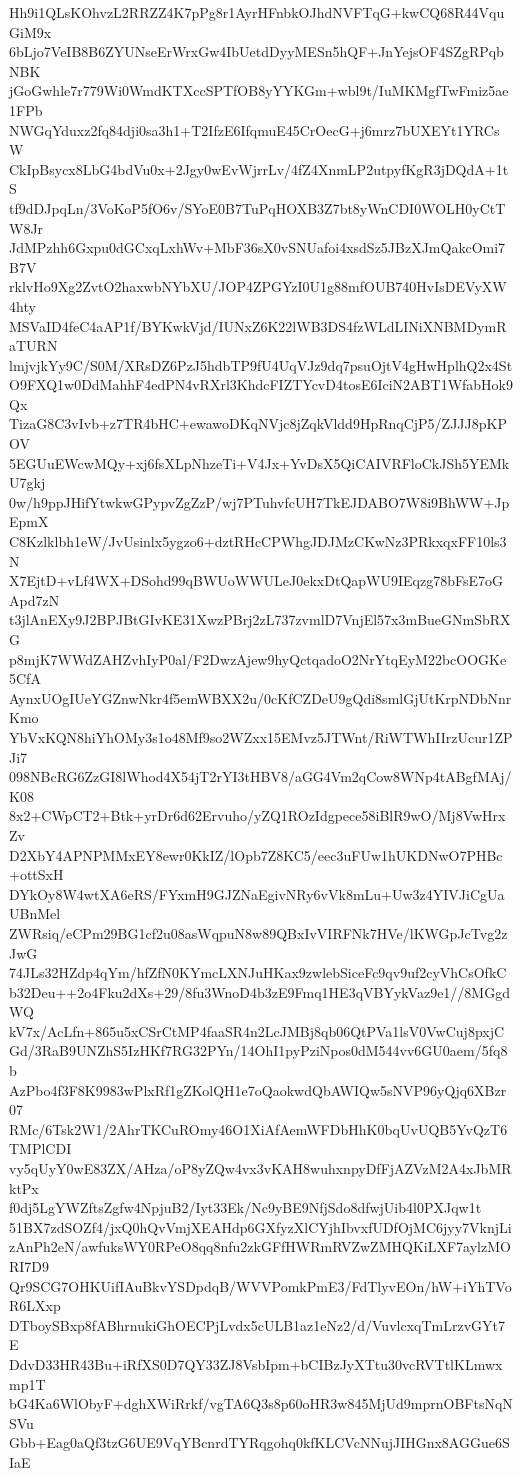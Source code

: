 Hh9i1QLsKOhvzL2RRZZ4K7pPg8r1AyrHFnbkOJhdNVFTqG+kwCQ68R44VquGiM9x
6bLjo7VeIB8B6ZYUNseErWrxGw4IbUetdDyyMESn5hQF+JnYejsOF4SZgRPqbNBK
jGoGwhle7r779Wi0WmdKTXccSPTfOB8yYYKGm+wbl9t/IuMKMgfTwFmiz5ae1FPb
NWGqYduxz2fq84dji0sa3h1+T2IfzE6IfqmuE45CrOecG+j6mrz7bUXEYt1YRCsW
CkIpBsycx8LbG4bdVu0x+2Jgy0wEvWjrrLv/4fZ4XnmLP2utpyfKgR3jDQdA+1tS
tf9dDJpqLn/3VoKoP5fO6v/SYoE0B7TuPqHOXB3Z7bt8yWnCDI0WOLH0yCtTW8Jr
JdMPzhh6Gxpu0dGCxqLxhWv+MbF36sX0vSNUafoi4xsdSz5JBzXJmQakcOmi7B7V
rklvHo9Xg2ZvtO2haxwbNYbXU/JOP4ZPGYzI0U1g88mfOUB740HvIsDEVyXW4hty
MSVaID4feC4aAP1f/BYKwkVjd/IUNxZ6K22lWB3DS4fzWLdLINiXNBMDymRaTURN
lmjvjkYy9C/S0M/XRsDZ6PzJ5hdbTP9fU4UqVJz9dq7psuOjtV4gHwHplhQ2x4St
O9FXQ1w0DdMahhF4edPN4vRXrl3KhdcFIZTYcvD4tosE6IciN2ABT1WfabHok9Qx
TizaG8C3vIvb+z7TR4bHC+ewawoDKqNVjc8jZqkVldd9HpRnqCjP5/ZJJJ8pKPOV
5EGUuEWcwMQy+xj6fsXLpNhzeTi+V4Jx+YvDsX5QiCAIVRFloCkJSh5YEMkU7gkj
0w/h9ppJHifYtwkwGPypvZgZzP/wj7PTuhvfcUH7TkEJDABO7W8i9BhWW+JpEpmX
C8Kzlklbh1eW/JvUsinlx5ygzo6+dztRHcCPWhgJDJMzCKwNz3PRkxqxFF10ls3N
X7EjtD+vLf4WX+DSohd99qBWUoWWULeJ0ekxDtQapWU9IEqzg78bFsE7oGApd7zN
t3jlAnEXy9J2BPJBtGIvKE31XwzPBrj2zL737zvmlD7VnjEl57x3mBueGNmSbRXG
p8mjK7WWdZAHZvhIyP0al/F2DwzAjew9hyQctqadoO2NrYtqEyM22bcOOGKe5CfA
AynxUOgIUeYGZnwNkr4f5emWBXX2u/0cKfCZDeU9gQdi8smlGjUtKrpNDbNnrKmo
YbVxKQN8hiYhOMy3s1o48Mf9so2WZxx15EMvz5JTWnt/RiWTWhIIrzUcur1ZPJi7
098NBcRG6ZzGI8lWhod4X54jT2rYI3tHBV8/aGG4Vm2qCow8WNp4tABgfMAj/K08
8x2+CWpCT2+Btk+yrDr6d62Ervuho/yZQ1ROzIdgpece58iBlR9wO/Mj8VwHrxZv
D2XbY4APNPMMxEY8ewr0KkIZ/lOpb7Z8KC5/eec3uFUw1hUKDNwO7PHBc+ottSxH
DYkOy8W4wtXA6eRS/FYxmH9GJZNaEgivNRy6vVk8mLu+Uw3z4YIVJiCgUaUBnMel
ZWRsiq/eCPm29BG1cf2u08asWqpuN8w89QBxIvVIRFNk7HVe/lKWGpJcTvg2zJwG
74JLs32HZdp4qYm/hfZfN0KYmcLXNJuHKax9zwlebSiceFc9qv9uf2cyVhCsOfkC
b32Deu++2o4Fku2dXs+29/8fu3WnoD4b3zE9Fmq1HE3qVBYykVaz9e1//8MGgdWQ
kV7x/AcLfn+865u5xCSrCtMP4faaSR4n2LcJMBj8qb06QtPVa1lsV0VwCuj8pxjC
Gd/3RaB9UNZhS5IzHKf7RG32PYn/14OhI1pyPziNpos0dM544vv6GU0aem/5fq8b
AzPbo4f3F8K9983wPlxRf1gZKolQH1e7oQaokwdQbAWIQw5sNVP96yQjq6XBzr07
RMc/6Tsk2W1/2AhrTKCuROmy46O1XiAfAemWFDbHhK0bqUvUQB5YvQzT6TMPlCDI
vy5qUyY0wE83ZX/AHza/oP8yZQw4vx3vKAH8wuhxnpyDfFjAZVzM2A4xJbMRktPx
f0dj5LgYWZftsZgfw4NpjuB2/Iyt33Ek/Nc9yBE9NfjSdo8dfwjUib4l0PXJqw1t
51BX7zdSOZf4/jxQ0hQvVmjXEAHdp6GXfyzXlCYjhIbvxfUDfOjMC6jyy7VknjLi
zAnPh2eN/awfuksWY0RPeO8qq8nfu2zkGFfHWRmRVZwZMHQKiLXF7aylzMORI7D9
Qr9SCG7OHKUifIAuBkvYSDpdqB/WVVPomkPmE3/FdTlyvEOn/hW+iYhTVoR6LXxp
DTboySBxp8fABhrnukiGhOECPjLvdx5cULB1az1eNz2/d/VuvlcxqTmLrzvGYt7E
DdvD33HR43Bu+iRfXS0D7QY33ZJ8VsbIpm+bCIBzJyXTtu30vcRVTtlKLmwxmp1T
bG4Ka6WlObyF+dghXWiRrkf/vgTA6Q3s8p60oHR3w845MjUd9mprnOBFtsNqNSVu
Gbb+Eag0aQf3tzG6UE9VqYBcnrdTYRqgohq0kfKLCVcNNujJIHGnx8AGGue6SIaE
